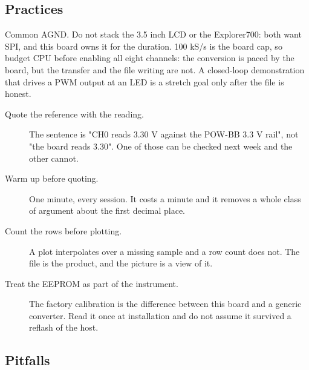 \subsection*{Practices}

Common AGND. Do not stack the 3.5 inch LCD or the Explorer700: both want SPI, and this board owns it for the duration. 100 kS/s is the board cap, so budget CPU before enabling all eight channels: the conversion is paced by the board, but the transfer and the file writing are not. A closed-loop demonstration that drives a PWM output at an LED is a stretch goal only after the file is honest.

\begin{description}
\item[Quote the reference with the reading.] The sentence is "CH0 reads 3.30 V against the POW-BB 3.3 V rail", not "the board reads 3.30". One of those can be checked next week and the other cannot.
\item[Warm up before quoting.] One minute, every session. It costs a minute and it removes a whole class of argument about the first decimal place.
\item[Count the rows before plotting.] A plot interpolates over a missing sample and a row count does not. The file is the product, and the picture is a view of it.
\item[Treat the EEPROM as part of the instrument.] The factory calibration is the difference between this board and a generic converter. Read it once at installation and do not assume it survived a reflash of the host.
\end{description}

\subsection*{Pitfalls}

